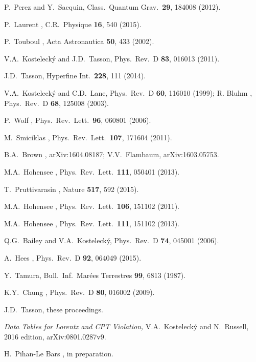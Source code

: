 \documentclass{ws-procs9x6-cpt16}
\begin{document}
\begin{thebibliography}{xx}

P.\ Perez and Y.\ Sacquin, 
Class.\ Quantum Grav.\ {\bf 29}, 184008 (2012).

P.\ Laurent \etal, 
C.R.\ Physique {\bf 16}, 540 (2015).

P.\ Touboul \etal, 
Acta Astronautica {\bf 50}, 433 (2002).

V.A.\ Kosteleck\'y and J.D.\ Tasson, 
Phys.\ Rev.\ D {\bf 83}, 016013 (2011).

J.D.\ Tasson, 
Hyperfine Int.\ {\bf 228}, 111 (2014).

V.A.\ Kosteleck\'y and C.D.\ Lane,
Phys.\ Rev.\ D {\bf 60}, 116010 (1999); 
R. Bluhm \etal,
Phys.\ Rev.\ D {\bf 68}, 125008 (2003).

P.\ Wolf \etal,
Phys.\ Rev.\ Lett.\ {\bf 96}, 060801 (2006).

M.\ Smiciklas \etal, 
Phys.\ Rev.\ Lett.\ {\bf 107}, 171604 (2011).

B.A.\ Brown \etal,
arXiv:1604.08187;
V.V.\ Flambaum, 
arXiv:1603.05753.

M.A.\ Hohensee \etal,
Phys.\ Rev.\ Lett.\ {\bf 111}, 050401 (2013).

T.\ Pruttivarasin \etal,
Nature {\bf 517}, 592 (2015).

M.A.\ Hohensee \etal,
Phys.\ Rev.\ Lett.\ {\bf 106}, 151102 (2011).

M.A.\ Hohensee \etal,
Phys.\ Rev.\ Lett.\ {\bf 111}, 151102 (2013).

Q.G.\ Bailey and V.A.\ Kosteleck\'y, 
Phys.\ Rev.\ D {\bf 74}, 045001 (2006).

A.\ Hees \etal,
Phys.\ Rev.\ D {\bf 92}, 064049 (2015).

Y.\ Tamura, 
Bull.\ Inf.\ Mar{\'e}es Terrestres {\bf 99}, 6813 (1987).

K.Y.\ Chung \etal, 
Phys.\ Rev.\ D {\bf 80}, 016002 (2009).

J.D.\ Tasson, 
these proceedings.

{\it Data Tables for Lorentz and CPT Violation,}
V.A.\ Kosteleck\'y and N.\ Russell,
2016 edition,
arXiv:0801.0287v9.

H.\ Pihan-Le Bars \etal, 
in preparation.

\end{thebibliography}
\end{document}

